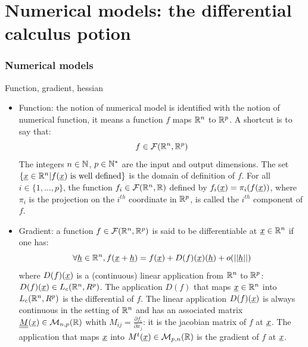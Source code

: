 \documentclass[8pt]{beamer}
\begin{document}
\section[Numerical models: the differential calculus potion]{Numerical models: the differential calculus potion}
\begin{frame}
  \frametitle{Numerical models}
  \begin{block}{Function, gradient, hessian}
    \begin{itemize}
    \item \alert{Function:} the notion of \alert{numerical model} is identified with the notion of \alert{numerical function}, it means a function $f$ maps ${\mathbb R}^n$ to ${\mathbb R}^p$. A shortcut is to say that:
      \begin{equation}
        f\in\mathcal{F}({\mathbb R}^n,{\mathbb R}^p)
      \end{equation}
      The integers $n\in{\mathbb N}$, $p\in{\mathbb N}^{*}$ are the \alert{input} and \alert{output} dimensions. The set $\{{\underline{x}}\in{\mathbb R}^n|f({\underline{x}})\mbox{ is well defined}\}$ is the \alert{domain of definition} of $f$. For all $i\in\{1,\dots,p\}$, the function $f_i\in\mathcal{F}({\mathbb R}^n,{\mathbb R})$ defined by $f_i({\underline{x}})=\pi_i(f({\underline{x}}))$, where $\pi_i$ is the projection on the $i^{th}$ coordinate in ${\mathbb R}^p$, is called the \alert{$i^{th}$ component} of $f$.
    \item \alert{Gradient:} a function $f\in\mathcal{F}({\mathbb R}^n,{\mathbb R}^p)$ is said to be \alert{differentiable} at ${\underline{x}}\in{\mathbb R}^n$ if one has:
      \begin{equation}
        \forall{\underline{h}}\in{\mathbb R}^n, f({\underline{x}}+{\underline{h}})=f({\underline{x}})+D(f)({\underline{x}})({\underline{h}})+o(||{\underline{h}}||)
      \end{equation}
      where $D(f)({\underline{x}})$ is a (continuous) linear application from ${\mathbb R}^n$ to ${\mathbb R}^p$: $D(f)({\underline{x}})\in L_c({\mathbb R}^n,R^p)$. The application $D(f)$ that maps ${\underline{x}}\in{\mathbb R}^n$ into $L_c({\mathbb R}^n,R^p)$ is the \alert{differential} of $f$. The linear application $D(f)({\underline{x}})$ is always continuous in the setting of ${\mathbb R}^n$ and has an associated matrix ${\underline{\underline{M}}}({\underline{x}})\in\mathcal{M}_{n,p}({\mathbb R})$ whith $M_{ij}=\frac{\partial f_i}{\partial x_j}$: it is the \alert{jacobian matrix} of $f$ at ${\underline{x}}$. The application that maps ${\underline{x}}$ into $M^t({\underline{x}})\in\mathcal{M}_{p,n}({\mathbb R})$ is the \alert{gradient} of $f$ at ${\underline{x}}$.
    \end{itemize}
  \end{block}
\end{frame}
\end{document}
